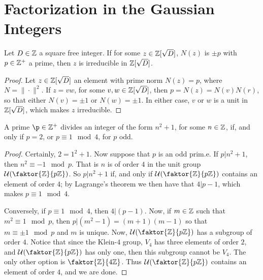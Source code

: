 \section{Factorization in the Gaussian Integers}
\label{section_6.4}

\begin{proposition}\label{proposition_6.4.1}
  Let $D \in \mathbb{Z}$ a square free integer. If for some $z \in \mathbb{Z}[\sqrt{D}]$,
  $N(z)$ is $\pm{p}$ with $p \in \mathbb{Z}^+$ a prime, then
  $z$ is irreducible in $\mathbb{Z}[\sqrt{D}]$.
\end{proposition}
\begin{proof}
  Let $z \in \mathbb{Z}[\sqrt{D}]$ an element with prime norm $N(z)=p$, where
  $N=\|\cdot\|^2$. If $z=vw$, for some  $v,w \in \mathbb{Z}[\sqrt{D}]$, then
  $p=N(z)=N(v)N(r)$, so that either $N(v)=\pm 1$ or $N(w)=\pm 1$. In either
  case, $v$ or  $w$ is a unit in  $\mathbb{Z}[\sqrt{D}]$, which makes $z$ irreducible.
\end{proof}

\begin{proposition}\label{proposition_6.4.2}
  A prime $\p \in \Z^+$ divides an integer of the form  $n^2+1$, for some  $n
  \in \mathbb{Z}$, if, and only if  $p=2$, or  $p \equiv 1 \mod{4}$, for $p$ odd.
\end{proposition}
\begin{proof}
  Certainly, $2=1^2+1$. Now suppose that  $p$ is an odd prim.e. If  $p|n^2+1$,
  then  $n^2 \equiv -1 \mod{p}$. That is $n$ is of order $4$ in the unit group
  $\Uc{(\faktor{\Z}{p\Z})}$. So $p|n^2+1$ if, and only if  $\Uc{(\faktor{\Z}{p\Z})}$
  contains an element of order $4$; by Lagrange's theorem we then have that
  $4|p-1$, which makes $p \equiv 1 \mod{4}$.

  Conversely, if $p \equiv 1 \mod{4}$, then $4|(p-1)$. Now, if $m \in \mathbb{Z}$ such
  that  $m^2 \equiv 1 \mod{p}$, then $p|(m^2-1)=(m+1)(m-1)$ so that $m \equiv
  \pm 1 \mod{p}$ and $m$ is unique. Now, $\Uc{(\faktor{\Z}{p\Z})}$ has a subgroup
  of order $4$. Notice that since the Klein-$4$ group, $V_4$ has three elements
  of order $2$, and  $\Uc{(\faktor{\Z}{p\Z})}$ has only one, then this subgroup
  cannot be $V_4$. The only other option is $\faktor{\Z}{4\Z}$. Thus
  $\Uc{(\faktor{\Z}{p\Z})}$ contains an element of order $4$, and we are done.
\end{proof}

